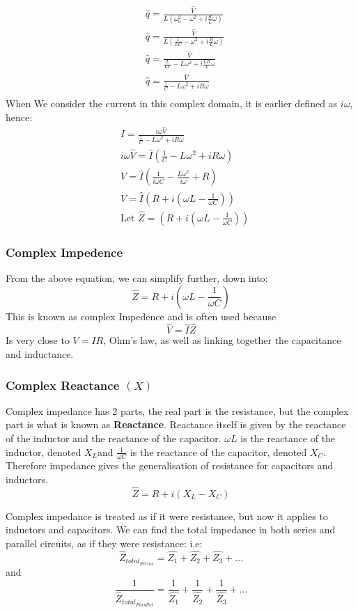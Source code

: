 \documentclass[10pt]{report}
\begin{document}
{\begin{align*}
& \hat{q}=\frac{\hat{V}}{L\left(\omega_{0}^{2}-\omega^{2}+i\frac{R}{L}\omega\right)} \\
& \hat{q}=\frac{\hat{V}}{L\left(\frac{1}{LC}-\omega^{2}+i\frac{R}{L}\omega\right)} \\
& \hat{q}=\frac{\hat{V}}{\frac{L}{LC}-L\omega^{2}+i\frac{LR}{L}\omega} \\
& \hat{q}=\frac{\hat{V}}{\frac{1}{C}-L\omega^{2}+i R\omega} \\
\end{align*}
When We consider the current in this complex domain, it is earlier defined as $i\omega$, hence:
\begin{align*}
& \hat{I}=\frac{i\omega\hat{V}}{\frac{1}{C}-L\omega^{2}+i R\omega} \\
& i\omega\hat{V}=\hat{I}\left(\frac{1}{C}-L\omega^{2}+i R\omega\right) \\
& \hat{V}=\hat{I}\left(\frac{1}{i\omega C}-\frac{L\omega^{2}}{i\omega}+R\right) \\
& \hat{V}=\hat{I}\left(R+i\left(\omega L-\frac{1}{\omega C}\right)\right) \\
& \text{Let }\hat{Z}=\left(R+i\left(\omega L-\frac{1}{\omega C}\right)\right)
\end{align*}
\subsubsection{Complex Impedence}
\par{From the above equation, we can simplify further, down into: \[
		\hat{Z}=R+i\left(\omega L-\frac{1}{\omega C}\right)
\] This is known as complex Impedence and is often used because \[
\hat{V}=\hat{I}\hat{Z}
\] Is very close to $V=IR$, Ohm's law, as well as linking together the capacitance and inductance.}
\subsubsection{Complex Reactance $\left(X\right)$}
\par{Complex impedance has 2 parts, the real part is the resistance, but the complex part is what is known as \textbf{Reactance}. Reactance itself is given by the reactance of the inductor and the reactance of the capacitor. $\omega L$ is the reactance of the inductor, denoted $X_{L}$and $\frac{1}{\omega C}$ is the reactance of the capacitor, denoted $X_{C}$. Therefore impedance gives the generalisation of resistance for capacitors and inductors.\[
		\hat{Z}=R+i\left(X_{L}-X_{C}\right)
\] }
\par{Complex impedance is treated as if it were resistance, but now it applies to inductors and capacitors. We can find the total impedance in both series and parallel circuits, as if they were resistance: i.e: \[
		\hat{Z}_{total_{Series}}=\hat{Z_{1}}+\hat{Z_{2}}+\hat{Z_{3}}+...
\] and \[
\frac{1}{\hat{Z}_{total_{Parallel}}}=\frac{1}{\hat{Z_{1}}}+\frac{1}{\hat{Z_{2}}}+\frac{1}{\hat{Z_{3}}}+...
\]  
}}
\end{document}
